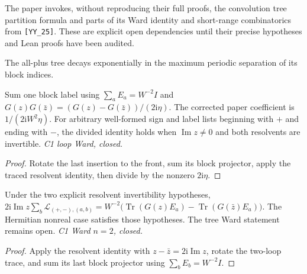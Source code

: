 \begin{remark}\label{rem:yy25}
  The paper invokes, without reproducing their full proofs, the convolution
  tree partition formula and parts of its Ward identity and short-range
  combinatorics from \texttt{[YY\_25]}.  These are explicit open dependencies
  until their precise hypotheses and Lean proofs have been audited.
\end{remark}

\begin{lemma}\label{lem:pureloop}
  The all-plus tree decays exponentially in the maximum periodic separation
  of its block indices.
\end{lemma}

\begin{lemma}\label{lem:ward-loop}
  \leanok
  Sum one block label using $\sum_a E_a=W^{-2}I$ and
  $G(z)G(\bar z)=(G(z)-G(\bar z))/(2\mathrm{i}\eta)$.
  The corrected paper coefficient is $1/(2\mathrm{i}W^2\eta)$.
  For arbitrary well-formed sign and label lists beginning with $+$ and ending
  with $-$, the divided identity holds when $\operatorname{Im}z\ne0$ and both
  resolvents are invertible. \emph{C1 loop Ward, closed.}
\end{lemma}
\begin{proof}\leanok
  Rotate the last insertion to the front, sum its block projector, apply the
  traced resolvent identity, then divide by the nonzero $2\mathrm{i}\eta$.
\end{proof}

\begin{lemma}\label{lem:ward-two}
  \leanok
  Under the two explicit resolvent invertibility hypotheses,
  $2\mathrm{i}\operatorname{Im}z\sum_b\mathcal L_{(+,-),(a,b)}
   =W^{-2}\bigl(\operatorname{Tr}(G(z)E_a)
                -\operatorname{Tr}(G(\bar z)E_a)\bigr)$.
  The Hermitian nonreal case satisfies those hypotheses. The tree Ward
  statement remains open. \emph{C1 Ward $n=2$, closed.}
\end{lemma}
\begin{proof}\leanok
  Apply the resolvent identity with $z-\bar z=2\mathrm{i}\operatorname{Im}z$,
  rotate the two-loop trace, and sum its last block projector using
  $\sum_b E_b=W^{-2}I$.
\end{proof}

